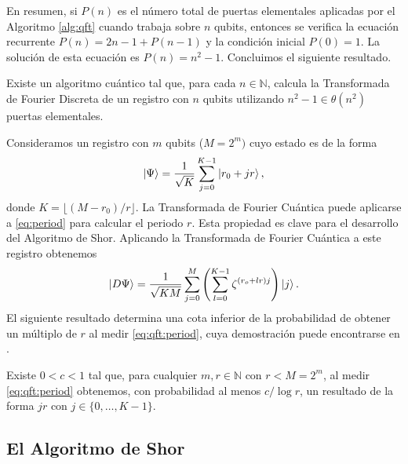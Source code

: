 \documentclass{article}
\begin{document}
En resumen, si $P(n)$ es el número total de puertas elementales aplicadas por el Algoritmo \ref{alg:qft} cuando trabaja sobre $n$ qubits, entonces se verifica la ecuación recurrente $P(n) = 2n-1 + P(n-1)$ y la condición inicial $P(0) = 1$. La solución de esta ecuación es $P(n) = n^2-1$. Concluimos el siguiente resultado.

\begin{lemma}
  Existe un algoritmo cuántico tal que, para cada $n \in \mathbb{N}$, calcula la Transformada de Fourier Discreta de un registro con $n$ qubits utilizando $n^2-1 \in \theta(n^2)$ puertas elementales.
\end{lemma}

Consideramos un registro con $m$ qubits ($M = 2^m)$ cuyo estado es de la forma
\begin{equation} \label{eq:period}
  \ket{\Psi} = \frac{1}{\sqrt{K}}\sum_{j = 0}^{K-1} \ket{r_0 + j r},
\end{equation}
  donde $K = \lfloor (M-r_0) / r \rfloor$. La Transformada de Fourier Cuántica puede aplicarse a \eqref{eq:period} para calcular el periodo $r$. Esta propiedad es clave para el desarrollo del Algoritmo de Shor. Aplicando la Transformada de Fourier Cuántica a este registro obtenemos
  \begin{equation} \label{eq:qft:period}
  \ket{D \Psi} = \frac{1}{\sqrt{K M}} \sum_{j = 0}^M \left(\sum_{l = 0}^{K-1} \zeta^{(r_o + l r) j} \right) \ket{j}.
  \end{equation}
 El siguiente resultado determina una cota inferior de la probabilidad de obtener un múltiplo de $r$ al medir \eqref{eq:qft:period}, cuya demostración puede encontrarse en {\cite[Lemas 10.19 y 10.20]{arora}}.

\begin{theorem} \label{thm:qft}
  Existe $0 < c < 1$ tal que, para cualquier $m,r \in \mathbb{N}$ con $r < M = 2^m$, al medir \eqref{eq:qft:period} obtenemos, con probabilidad al menos $c/\log r$, un resultado de la forma $jr$ con $j \in \{0, \ldots, K-1\}$.
\end{theorem}

\subsection{El Algoritmo de Shor}
\end{document}
